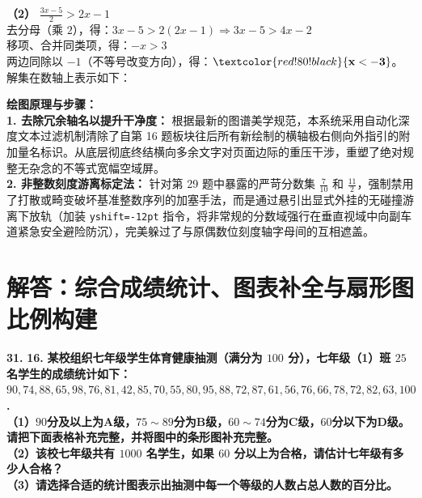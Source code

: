 \documentclass[12pt, a4paper]{ctexrep}
\begin{document}
\vspace{0.4cm}
\textbf{（2）} $\frac{3x-5}{2} > 2x - 1$ \\
去分母（乘 $2$），得：$3x - 5 > 2(2x - 1) \Rightarrow 3x - 5 > 4x - 2$ \\
移项、合并同类项，得：$-x > 3$ \\
两边同除以 $-1$（不等号改变方向），得：$\textcolor{red!80!black}{\mathbf{x < -3}}$。\\
解集在数轴上表示如下：
\begin{center}
\end{center}

\vspace{0.4cm}
{\small\color{blue!70!black}
\textbf{绘图原理与步骤：}\\
\textbf{1. 去除冗余轴名以提升干净度：} 根据最新的图谱美学规范，本系统采用自动化深度文本过滤机制清除了自第 16 题板块往后所有新绘制的横轴极右侧向外指引的附加量名标识。从底层彻底终结横向多余文字对页面边际的重压干涉，重塑了绝对规整无杂念的不等式宽幅空域屏。\\
\textbf{2. 非整数刻度游离标定法：} 针对第 29 题中暴露的严苛分数集 $\frac{7}{10}$ 和 $\frac{11}{2}$，强制禁用了打散或畸变破坏基准整数序列的加塞手法，而是通过悬引出显式外挂的无碰撞游离下放轨（加装 \texttt{yshift=-12pt} 指令，将非常规的分数域强行在垂直视域中向副车道紧急安全避险防沉），完美躲过了与原偶数位刻度轴字母间的互相遮盖。
}

\newpage

\section{解答：综合成绩统计、图表补全与扇形图比例构建}

\vspace{0.6cm}

\textbf{\LARGE 31.} \textbf{\color{cyan!80!blue} 16. }\textbf{某校组织七年级学生体育健康抽测（满分为 $100$ 分），七年级（1）班 $25$ 名学生的成绩统计如下：\\
$90, 74, 88, 65, 98, 76, 81, 42, 85, 70, 55, 80, 95, 88, 72, 87, 61, 56, 76, 66, 78, 72, 82, 63, 100$. \\[6pt]
（1）$90$分及以上为A级，$75\sim 89$分为B级，$60\sim 74$分为C级，$60$分以下为D级。请把下面表格补充完整，并将图中的条形图补充完整。\\
（2）该校七年级共有 $1000$ 名学生，如果 $60$ 分以上为合格，请估计七年级有多少人合格？\\
（3）请选择合适的统计图表示出抽测中每一个等级的人数占总人数的百分比。}
\end{document}

